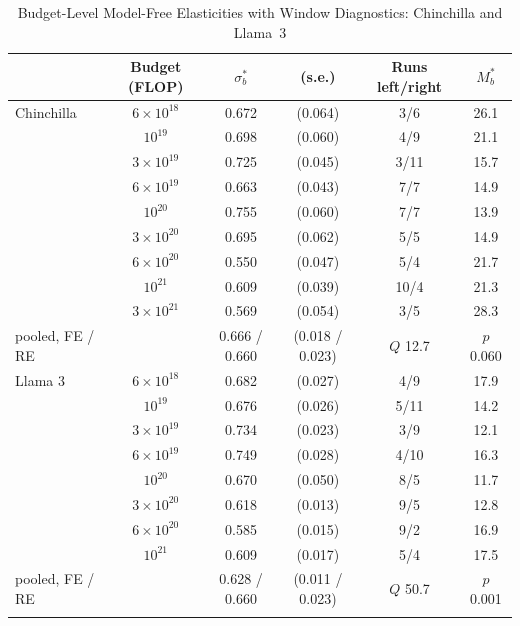 \begin{table}[tp]
\centering
\caption{Budget-Level Model-Free Elasticities with Window Diagnostics: Chinchilla and Llama~3}
\label{tab:app-budgets}
\footnotesize
\setlength{\tabcolsep}{2pt}
\begin{tabular*}{\textwidth}{@{\extracolsep{\fill}}>{\raggedright\arraybackslash}p{}ccccc@{}}
\toprule
 & Budget (FLOP) & $\sigma^*_b$ & (s.e.) & Runs left/right & $M^*_b$ \\
\midrule
Chinchilla & $6\times10^{18}$ & 0.672 & (0.064) & 3/6 & 26.1 \\
 & $10^{19}$ & 0.698 & (0.060) & 4/9 & 21.1 \\
 & $3\times10^{19}$ & 0.725 & (0.045) & 3/11 & 15.7 \\
 & $6\times10^{19}$ & 0.663 & (0.043) & 7/7 & 14.9 \\
 & $10^{20}$ & 0.755 & (0.060) & 7/7 & 13.9 \\
 & $3\times10^{20}$ & 0.695 & (0.062) & 5/5 & 14.9 \\
 & $6\times10^{20}$ & 0.550 & (0.047) & 5/4 & 21.7 \\
 & $10^{21}$ & 0.609 & (0.039) & 10/4 & 21.3 \\
 & $3\times10^{21}$ & 0.569 & (0.054) & 3/5 & 28.3 \\
\quad pooled, FE / RE & & 0.666 / 0.660 & (0.018 / 0.023) & $Q$ 12.7 & $p$ 0.060 \\
\addlinespace
Llama 3 & $6\times10^{18}$ & 0.682 & (0.027) & 4/9 & 17.9 \\
 & $10^{19}$ & 0.676 & (0.026) & 5/11 & 14.2 \\
 & $3\times10^{19}$ & 0.734 & (0.023) & 3/9 & 12.1 \\
 & $6\times10^{19}$ & 0.749 & (0.028) & 4/10 & 16.3 \\
 & $10^{20}$ & 0.670 & (0.050) & 8/5 & 11.7 \\
 & $3\times10^{20}$ & 0.618 & (0.013) & 9/5 & 12.8 \\
 & $6\times10^{20}$ & 0.585 & (0.015) & 9/2 & 16.9 \\
 & $10^{21}$ & 0.609 & (0.017) & 5/4 & 17.5 \\
\quad pooled, FE / RE & & 0.628 / 0.660 & (0.011 / 0.023) & $Q$ 50.7 & $p$ 0.001 \\
\addlinespace
\bottomrule
\end{tabular*}


\end{table}
